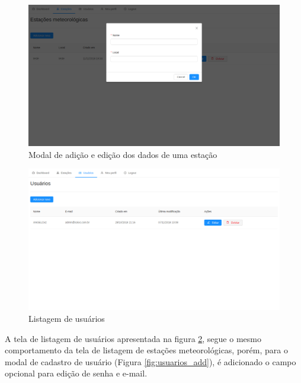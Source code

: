 \begin{figure}[H]
    \centering
    \caption{Modal de adição e edição dos dados de uma estação \label{fig:estacoes_add}}
    \includegraphics[scale=0.3]{telas/estacoes_add.png}
    \hfill
{}
\end{figure}

\begin{figure}[H]
    \centering
    \caption{Listagem de usuários \label{fig:usuarios}}
    \includegraphics[scale=0.3]{telas/usuarios.png}
    \hfill
{}
\end{figure}

A tela de listagem de usuários apresentada na figura \ref{fig:usuarios}, segue o mesmo comportamento da tela de listagem de estações meteorológicas, porém, para o modal de cadastro de usuário (Figura \ref{fig:usuarios_add}), é adicionado o campo opcional para edição de senha e e-mail.

